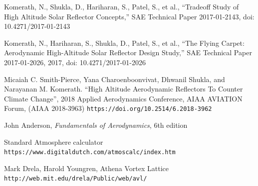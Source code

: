 \documentclass[12pt]{report} %
\begin{document}
\begin{thebibliography}{6}

Komerath, N., Shukla, D., Hariharan, S., Patel, S., et al., ``Tradeoff Study of High Altitude Solar Reflector Concepts,''
SAE Technical Paper 2017-01-2143, doi: 10.4271/2017-01-2143

Komerath, N., Hariharan, S., Shukla, D., Patel, S., et al., ``The Flying Carpet: Aerodynamic High-Altitude Solar Reflector Design Study,''
SAE Technical Paper 2017-01-2026, 2017, doi: 10.4271/2017-01-2026

Micaiah C. Smith-Pierce, Yana Charoenboonvivat, Dhwanil Shukla, and Narayanan M. Komerath. ``High Altitude Aerodynamic Reflectors To
Counter Climate Change'', 2018 Applied Aerodynamics Conference, AIAA AVIATION Forum, (AIAA 2018-3963)
\verb|https://doi.org/10.2514/6.2018-3962|

John Anderson, \textit{Fundamentals of Aerodynamics}, 6th edition

Standard Atmosphere calculator
\verb|https://www.digitaldutch.com/atmoscalc/index.htm|

Mark Drela, Harold Youngren, Athena Vortex Lattice
\verb|http://web.mit.edu/drela/Public/web/avl/|

\end{thebibliography}
\end{document}
